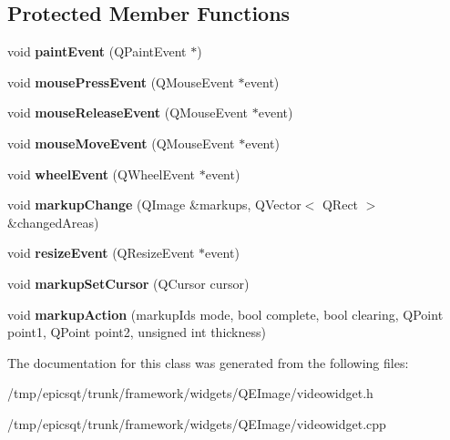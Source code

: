 \subsection*{Protected Member Functions}
\begin{DoxyCompactItemize}
\item 
\hypertarget{classVideoWidget_aa939c30c66f34fb9180ffb4b05906222}{
void {\bfseries paintEvent} (QPaintEvent $\ast$)}
\label{classVideoWidget_aa939c30c66f34fb9180ffb4b05906222}

\item 
\hypertarget{classVideoWidget_a0009b23a619f77a507d91af01c9cc74e}{
void {\bfseries mousePressEvent} (QMouseEvent $\ast$event)}
\label{classVideoWidget_a0009b23a619f77a507d91af01c9cc74e}

\item 
\hypertarget{classVideoWidget_a228ff06d168fdf815b4de2c94e047313}{
void {\bfseries mouseReleaseEvent} (QMouseEvent $\ast$event)}
\label{classVideoWidget_a228ff06d168fdf815b4de2c94e047313}

\item 
\hypertarget{classVideoWidget_a60c38c3490f1408106c4ba7fdfacc013}{
void {\bfseries mouseMoveEvent} (QMouseEvent $\ast$event)}
\label{classVideoWidget_a60c38c3490f1408106c4ba7fdfacc013}

\item 
\hypertarget{classVideoWidget_a1d955c5ed2bbe15a27634c659859b3db}{
void {\bfseries wheelEvent} (QWheelEvent $\ast$event)}
\label{classVideoWidget_a1d955c5ed2bbe15a27634c659859b3db}

\item 
\hypertarget{classVideoWidget_a5c8d6457e7083a0f9cf8caec313666f1}{
void {\bfseries markupChange} (QImage \&markups, QVector$<$ QRect $>$ \&changedAreas)}
\label{classVideoWidget_a5c8d6457e7083a0f9cf8caec313666f1}

\item 
\hypertarget{classVideoWidget_a535271277b91deed6d52cb1d11caf80d}{
void {\bfseries resizeEvent} (QResizeEvent $\ast$event)}
\label{classVideoWidget_a535271277b91deed6d52cb1d11caf80d}

\item 
\hypertarget{classVideoWidget_a0237f59710ca9812c9f57375211d2f14}{
void {\bfseries markupSetCursor} (QCursor cursor)}
\label{classVideoWidget_a0237f59710ca9812c9f57375211d2f14}

\item 
\hypertarget{classVideoWidget_afdc3e6bab13410e0ddf66f9268ea1959}{
void {\bfseries markupAction} (markupIds mode, bool complete, bool clearing, QPoint point1, QPoint point2, unsigned int thickness)}
\label{classVideoWidget_afdc3e6bab13410e0ddf66f9268ea1959}

\end{DoxyCompactItemize}


The documentation for this class was generated from the following files:\begin{DoxyCompactItemize}
\item 
/tmp/epicsqt/trunk/framework/widgets/QEImage/videowidget.h\item 
/tmp/epicsqt/trunk/framework/widgets/QEImage/videowidget.cpp\end{DoxyCompactItemize}
